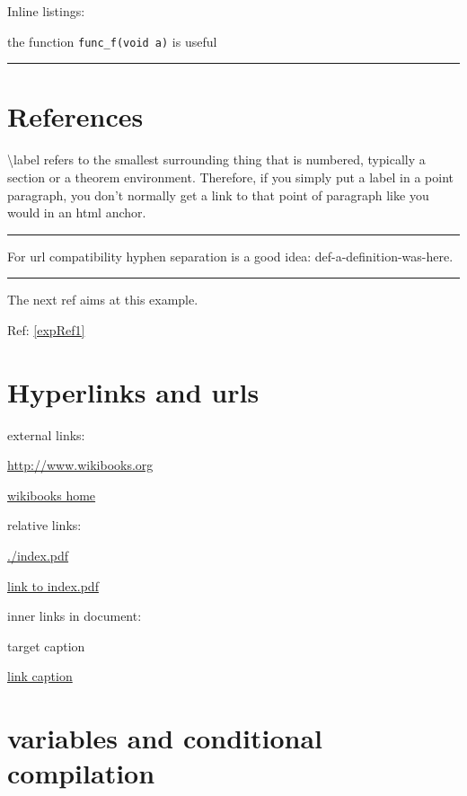 \documentclass[12pt]{article}
\newcommand{\inOut}[1]{#1}                                %
\begin{document}
    \begin{example} \label{expLst2}
        Inline listings:

            the function \lstinline|func_f(void a)| is useful
    \end{example}\hrule

    \section{References}\label{secRef}

    \begin{remark} \label{remLab1}
        \textbackslash{}label refers to the smallest surrounding thing that is numbered, typically a section or a theorem environment. Therefore, if you simply put a label in a point paragraph, you don't normally get a link to that point of paragraph like you would in an html anchor.
    \end{remark}\hrule

    \begin{remark} \label{remLab2}
        For url compatibility hyphen separation is a good idea: def-a-definition-was-here.
    \end{remark}\hrule

    \begin{example} \label{expRef1}
        \inOut{
            The next ref aims at this example.

            Ref: \ref{expRef1}
        }
    \end{example}

\section{Hyperlinks and urls}\label{hyperlinks-urls}

    external links:

    \url{http://www.wikibooks.org}

    \href{http://www.wikibooks.org}{wikibooks home}

    relative links:

    \url{./index.pdf}

    \href{./index.pdf}{link to index.pdf}

    inner links in document:

    \hypertarget{label}{target caption}

    \hyperlink{label}{link caption}

    \section{variables and conditional compilation}
\end{document}
